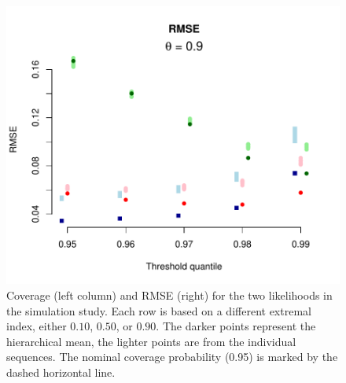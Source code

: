 \begin{figure}[H]
\begin{center}
\includegraphics[scale=0.48]{../extremal_comparison/figs/sim_rmse_90.pdf}
\end{center}
\caption{Coverage (left column) and RMSE (right) for the two likelihoods in the simulation study. Each row is based on a different extremal index, either $0.10$, $0.50$, or $0.90$. The darker points represent the hierarchical mean, the lighter points are from the individual sequences. The nominal coverage probability (0.95) is marked by the dashed horizontal line.}
\label{figsim}
\end{figure}
